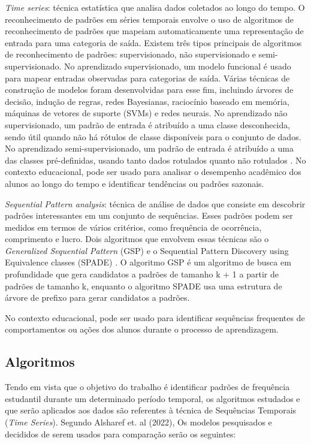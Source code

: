 \begin{enumerate}
{    \item \textit{Time series}: técnica estatística que analisa dados coletados ao longo do tempo. O reconhecimento de padrões em séries temporais envolve o uso de algoritmos de reconhecimento de padrões que mapeiam automaticamente uma representação de entrada para uma categoria de saída. Existem três tipos principais de algoritmos de reconhecimento de padrões: supervisionado, não supervisionado e semi-supervisionado. No aprendizado supervisionado, um modelo funcional é usado para mapear entradas observadas para categorias de saída. Várias técnicas de construção de modelos foram desenvolvidas para esse fim, incluindo árvores de decisão, indução de regras, redes Bayesianas, raciocínio baseado em memória, máquinas de vetores de suporte (SVMs) e redes neurais. No aprendizado não supervisionado, um padrão de entrada é atribuído a uma classe desconhecida, sendo útil quando não há rótulos de classe disponíveis para o conjunto de dados. No aprendizado semi-supervisionado, um padrão de entrada é atribuído a uma das classes pré-definidas, usando tanto dados rotulados quanto não rotulados  \cite{jessica:time}. No contexto educacional, pode ser usado para analisar o desempenho acadêmico dos alunos ao longo do tempo e identificar tendências ou padrões sazonais.

    \item \textit{Sequential Pattern analysis}: técnica de análise de dados que consiste em descobrir padrões interessantes em um conjunto de sequências. Esses padrões podem ser medidos em termos de vários critérios, como frequência de ocorrência, comprimento e lucro. Dois algoritmos que envolvem essas técnicas são o \textit{Generalized Sequential Pattern} (GSP) e o Sequential Pattern Discovery using Equivalence classes (SPADE) \cite{FournierViger2017ASO}. O algoritmo GSP é um algoritmo de busca em profundidade que gera candidatos a padrões de tamanho k + 1 a partir de padrões de tamanho k, enquanto o algoritmo SPADE usa uma estrutura de árvore de prefixo para gerar candidatos a padrões.} No contexto educacional, pode ser usado para identificar sequências frequentes de comportamentos ou ações dos alunos durante o processo de aprendizagem. 
\end{enumerate}

\subsection{Algoritmos}

Tendo em vista que o objetivo do trabalho é identificar padrões de frequência estudantil durante um determinado período temporal, os algoritmos estudados e que serão aplicados aos dados são referentes à técnica de Sequências Temporais (\textit{Time Series}). Segundo Alsharef et. al (2022)\nocite{Alsharef2022},  Os modelos pesquisados e decididos de serem usados para comparação serão os seguintes:

